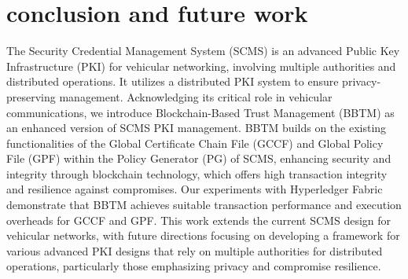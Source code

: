\section{conclusion and future work}
\label{conclusion}
The Security Credential Management System (SCMS) is an advanced Public Key Infrastructure (PKI) for vehicular networking, involving multiple authorities and distributed operations. It utilizes a distributed PKI system to ensure privacy-preserving management. Acknowledging its critical role in vehicular communications, we introduce Blockchain-Based Trust Management (BBTM) as an enhanced version of SCMS PKI management. BBTM builds on the existing functionalities of the Global Certificate Chain File (GCCF) and Global Policy File (GPF) within the Policy Generator (PG) of SCMS, enhancing security and integrity through blockchain technology, which offers high transaction integrity and resilience against compromises. Our experiments with Hyperledger Fabric demonstrate that BBTM achieves suitable transaction performance and execution overheads for GCCF and GPF. This work extends the current SCMS design for vehicular networks, with future directions focusing on developing a framework for various advanced PKI designs that rely on multiple authorities for distributed operations, particularly those emphasizing privacy and compromise resilience.

